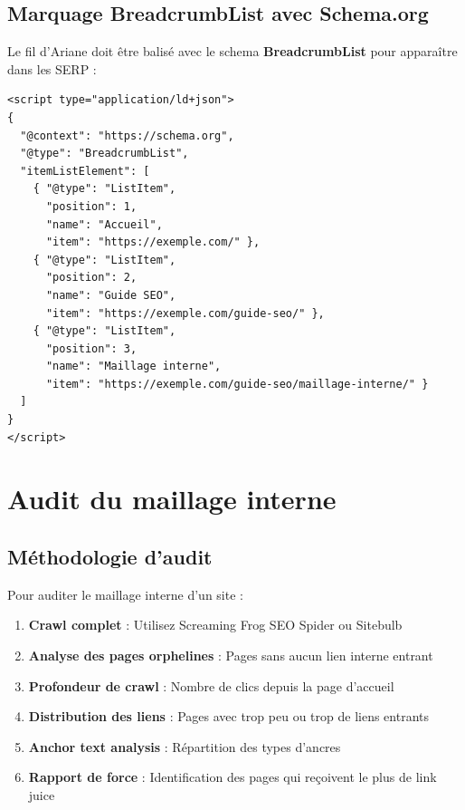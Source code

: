\documentclass[12pt,a4paper,twoside]{report}
\newcommand{\keyword}[1]{\textbf{\textcolor{googleblue}{#1}}}
\begin{document}
\subsection{Marquage BreadcrumbList avec Schema.org}

Le fil d'Ariane doit être balisé avec le schema \keyword{BreadcrumbList} pour apparaître dans les SERP :

\begin{lstlisting}[style=htmlcode,caption={Breadcrumb avec données structurées JSON-LD}]
<script type="application/ld+json">
{
  "@context": "https://schema.org",
  "@type": "BreadcrumbList",
  "itemListElement": [
    { "@type": "ListItem",
      "position": 1,
      "name": "Accueil",
      "item": "https://exemple.com/" },
    { "@type": "ListItem",
      "position": 2,
      "name": "Guide SEO",
      "item": "https://exemple.com/guide-seo/" },
    { "@type": "ListItem",
      "position": 3,
      "name": "Maillage interne",
      "item": "https://exemple.com/guide-seo/maillage-interne/" }
  ]
}
</script>
\end{lstlisting}

\section{Audit du maillage interne}

\subsection{Méthodologie d'audit}

Pour auditer le maillage interne d'un site :

\begin{enumerate}
    \item \textbf{Crawl complet} : Utilisez Screaming Frog SEO Spider ou Sitebulb
    \item \textbf{Analyse des pages orphelines} : Pages sans aucun lien interne entrant
    \item \textbf{Profondeur de crawl} : Nombre de clics depuis la page d'accueil
    \item \textbf{Distribution des liens} : Pages avec trop peu ou trop de liens entrants
    \item \textbf{Anchor text analysis} : Répartition des types d'ancres
    \item \textbf{Rapport de force} : Identification des pages qui reçoivent le plus de link juice
\end{enumerate}
\end{document}
